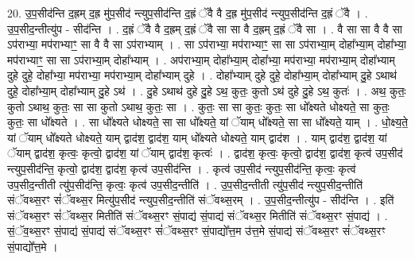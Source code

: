 \documentclass[17pt]{extarticle}
\begin{document}
20. उ॒प॒सीद॑न्ति द॒ह्रम् द॒ह्र मु॑प॒सीद॑ न्त्युप॒सीद॑न्ति द॒ह्रं ॅवै वै द॒ह्र मु॑प॒सीद॑ न्त्युप॒सीद॑न्ति द॒ह्रं ॅवै । . उ॒प॒सीद॒न्तीत्यु॑प - सीद॑न्ति । . द॒ह्रं ॅवै वै द॒ह्रम् द॒ह्रं ॅवै सा सा वै द॒ह्रम् द॒ह्रं ॅवै सा । . वै सा सा वै वै सा ऽप॑राभ्या॒ मप॑राभ्याꣳ॒॒ सा वै वै सा ऽप॑राभ्याम् । . सा ऽप॑राभ्या॒ मप॑राभ्याꣳ॒॒ सा सा ऽप॑राभ्या॒म् दोहा᳚भ्या॒म् दोहा᳚भ्या॒ मप॑राभ्याꣳ॒॒ सा सा ऽप॑राभ्या॒म् दोहा᳚भ्याम् । . अप॑राभ्या॒म् दोहा᳚भ्या॒म् दोहा᳚भ्या॒ मप॑राभ्या॒ मप॑राभ्या॒म् दोहा᳚भ्याम् दुहे दुहे॒ दोहा᳚भ्या॒ मप॑राभ्या॒ मप॑राभ्या॒म् दोहा᳚भ्याम् दुहे । . दोहा᳚भ्याम् दुहे दुहे॒ दोहा᳚भ्या॒म् दोहा᳚भ्याम् दु॒हे ऽथाथ॑ दुहे॒ दोहा᳚भ्या॒म् दोहा᳚भ्याम् दु॒हे ऽथ॑ । . दु॒हे ऽथाथ॑ दुहे दु॒हे ऽथ॒ कुतः॒ कुतो ऽथ॑ दुहे दु॒हे ऽथ॒ कुतः॑ । . अथ॒ कुतः॒ कुतो ऽथाथ॒ कुतः॒ सा सा कुतो ऽथाथ॒ कुतः॒ सा । . कुतः॒ सा सा कुतः॒ कुतः॒ सा धो᳚क्ष्यते धोक्ष्यते॒ सा कुतः॒ कुतः॒ सा धो᳚क्ष्यते । . सा धो᳚क्ष्यते धोक्ष्यते॒ सा सा धो᳚क्ष्यते॒ यां ॅयाम् धो᳚क्ष्यते॒ सा सा धो᳚क्ष्यते॒ याम् । . धो॒क्ष्य॒ते॒ यां ॅयाम् धो᳚क्ष्यते धोक्ष्यते॒ याम् द्वाद॑श॒ द्वाद॑श॒ याम् धो᳚क्ष्यते धोक्ष्यते॒ याम् द्वाद॑श । . याम् द्वाद॑श॒ द्वाद॑श॒ यां ॅयाम् द्वाद॑श॒ कृत्वः॒ कृत्वो॒ द्वाद॑श॒ यां ॅयाम् द्वाद॑श॒ कृत्वः॑ । . द्वाद॑श॒ कृत्वः॒ कृत्वो॒ द्वाद॑श॒ द्वाद॑श॒ कृत्व॑ उप॒सीद॑ न्त्युप॒सीद॑न्ति॒ कृत्वो॒ द्वाद॑श॒ द्वाद॑श॒ कृत्व॑ उप॒सीद॑न्ति । . कृत्व॑ उप॒सीद॑ न्त्युप॒सीद॑न्ति॒ कृत्वः॒ कृत्व॑ उप॒सीद॒न्तीती त्यु॑प॒सीद॑न्ति॒ कृत्वः॒ कृत्व॑ उप॒सीद॒न्तीति॑ । . उ॒प॒सीद॒न्तीती त्यु॑प॒सीद॑ न्त्युप॒सीद॒न्तीति॑ संॅवथ्स॒रꣳ सं॑ॅवथ्स॒र मित्यु॑प॒सीद॑ न्त्युप॒सीद॒न्तीति॑ संॅवथ्स॒रम् । . उ॒प॒सीद॒न्तीत्यु॑प - सीद॑न्ति । . इति॑ संॅवथ्स॒रꣳ सं॑ॅवथ्स॒र मितीति॑ संॅवथ्स॒रꣳ सं॒पाद्य॑ सं॒पाद्य॑ संॅवथ्स॒र मितीति॑ संॅवथ्स॒रꣳ सं॒पाद्य॑ । . सं॒ॅव॒थ्स॒रꣳ सं॒पाद्य॑ सं॒पाद्य॑ संॅवथ्स॒रꣳ सं॑ॅवथ्स॒रꣳ सं॒पाद्यो᳚त्त॒म उ॑त्त॒मे सं॒पाद्य॑ संॅवथ्स॒रꣳ सं॑ॅवथ्स॒रꣳ सं॒पाद्यो᳚त्त॒मे । \newline
\end{document}

